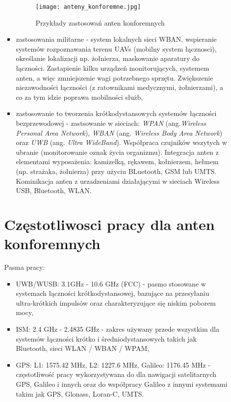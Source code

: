 \begin{itemize}
\begin{itemize}
\begin{itemize}
\begin{figure}[h!]
\centering
	\texttt{[image: anteny\_konforemne.jpg]}
	\caption{Przykłady zastosowań anten konforemnych}
\end{figure}

	\item zastosowania militarne - system lokalnych sieci WBAN, wspieranie systemów rozpoznawania terenu UAVs (mobilny system łącznosci), określanie lokalizacji np. żołnierza, maskowanie aparatury do łączności.
	Zastapienie kilku urządzeń monitorujących, systemem anten, a więc zmniejszenie wagi potrzebnego sprzętu. Zwiększenie niezawodności łączności (z ratownikami medycznymi, żołnierzami), a co za tym idzie poprawa mobilności służb,      

	\item zastosowanie to tworzenia krótkodystansowych systemów łączności bezprzewodowej - zastsowanie w sieciach: \emph{WPAN} (ang.\emph{Wireless Personal Area Network}), \emph{WBAN} (ang. \emph{Wireless Body Area Network}) oraz \emph{UWB} (ang. \emph{Ultra WideBand}). Współpraca czujników wszytych w ubranie (monitorowanie oznak życia organizmu). Integracja anten z elementami wyposażenia: kamizelką, rękawem, kołnierzem, hełmem (np. strażaka, żołnierza) przy użyciu BLuetooth, GSM lub UMTS. Kominikacja anten z urzadzeniami działającymi w sieciach Wireless USB, Bluetooth, WLAN.  

\end{itemize}
	

\section{Częstotliwosci pracy dla anten konforemnych}

Pasma pracy:

\begin{itemize}\setlength{\itemsep}{0pt}
	
	\item UWB/WUSB: 3.1GHz - 10.6 GHz (FCC) - pasmo stosowane w systemach łączności krótkodystansowej, bazujące na przesyłaniu ultra-krótkich impulsów oraz charakteryzujące się niskim poborem mocy,

	\item ISM: 2.4 GHz - 2.4835 GHz - zakres używany przede wszystkim dla systemów łączności krótko i średniodystansowych takich jak Bluetooth, sieci WLAN / WBAN / WPAM,

	\item GPS: L1: 1575.42 MHz, L2: 1227.6 MHz, Galileo: 1176.45 MHz - częstotliwość pracy wykorzystywana do dla nawigacji satelitarnych GPS, Galileo i innych oraz do współpracy Galileo z innymi systemami takim jak GPS, Glonass, Loran-C, UMTS.


\end{itemize}
\end{itemize}
\end{itemize}
